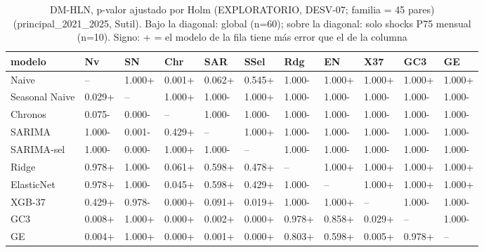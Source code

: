 \begin{table}[H]
\centering
\small
\caption{DM-HLN, p-valor ajustado por Holm (EXPLORATORIO, DESV-07; familia = 45 pares) (principal\_2021\_2025, Sutil). Bajo la diagonal: global (n=60); sobre la diagonal: solo shocks P75 mensual (n=10). Signo: + = el modelo de la fila tiene más error que el de la columna}
\label{tab:T09_DM_holm_matriz_principal_2021_2025_sutil}
\begin{tabular}{lllllllllll}
\toprule
modelo & Nv & SN & Chr & SAR & SSel & Rdg & EN & X37 & GC3 & GE \\
\midrule
Naive & -- & 1.000+ & 0.001+ & 0.062+ & 0.545+ & 1.000- & 1.000+ & 1.000+ & 1.000+ & 1.000+ \\
Seasonal Naive & 0.029+ & -- & 1.000+ & 1.000- & 1.000+ & 1.000- & 1.000- & 1.000- & 1.000- & 1.000- \\
Chronos & 0.075- & 0.000- & -- & 1.000- & 1.000- & 1.000- & 1.000- & 1.000- & 1.000- & 1.000- \\
SARIMA & 1.000- & 0.001- & 0.429+ & -- & 1.000+ & 1.000- & 1.000- & 1.000- & 1.000- & 1.000- \\
SARIMA-sel & 1.000- & 0.000- & 1.000+ & 1.000- & -- & 1.000- & 1.000- & 1.000- & 1.000- & 1.000- \\
Ridge & 0.978+ & 1.000- & 0.061+ & 0.598+ & 0.478+ & -- & 1.000+ & 1.000+ & 1.000+ & 1.000+ \\
ElasticNet & 0.978+ & 1.000- & 0.045+ & 0.598+ & 0.429+ & 1.000- & -- & 1.000+ & 1.000+ & 1.000+ \\
XGB-37 & 0.429+ & 0.978- & 0.000+ & 0.091+ & 0.019+ & 1.000- & 1.000+ & -- & 1.000- & 1.000- \\
GC3 & 0.008+ & 1.000+ & 0.000+ & 0.002+ & 0.000+ & 0.978+ & 0.858+ & 0.029+ & -- & 1.000- \\
GE & 0.004+ & 1.000+ & 0.000+ & 0.001+ & 0.000+ & 0.803+ & 0.598+ & 0.005+ & 0.978+ & -- \\
\bottomrule
\end{tabular}
\end{table}